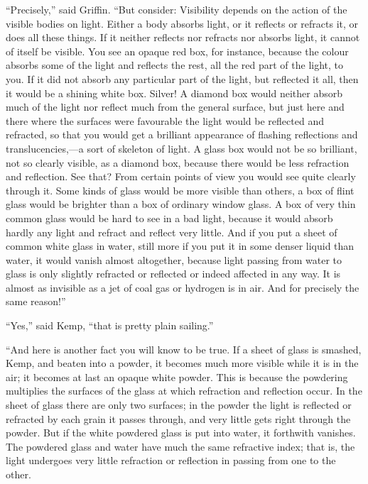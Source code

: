 “Precisely,” said Griffin. “But consider: Visibility depends on the action of the visible bodies on light. Either a body absorbs light, or it reflects or refracts it, or does all these things. If it neither reflects nor refracts nor absorbs light, it cannot of itself be visible. You see an opaque red box, for instance, because the colour absorbs some of the light and reflects the rest, all the red part of the light, to you. If it did not absorb any particular part of the light, but reflected it all, then it would be a shining white box. Silver! A diamond box would neither absorb much of the light nor reflect much from the general surface, but just here and there where the surfaces were favourable the light would be reflected and refracted, so that you would get a brilliant appearance of flashing reflections and translucencies,—a sort of skeleton of light. A glass box would not be so brilliant, not so clearly visible, as a diamond box, because there would be less refraction and reflection. See that? From certain points of view you would see quite clearly through it. Some kinds of glass would be more visible than others, a box of flint glass would be brighter than a box of ordinary window glass. A box of very thin common glass would be hard to see in a bad light, because it would absorb hardly any light and refract and reflect very little. And if you put a sheet of common white glass in water, still more if you put it in some denser liquid than water, it would vanish almost altogether, because light passing from water to glass is only slightly refracted or reflected or indeed affected in any way. It is almost as invisible as a jet of coal gas or hydrogen is in air. And for precisely the same reason!”

“Yes,” said Kemp, “that is pretty plain sailing.”

“And here is another fact you will know to be true. If a sheet of glass is smashed, Kemp, and beaten into a powder, it becomes much more visible while it is in the air; it becomes at last an opaque white powder. This is because the powdering multiplies the surfaces of the glass at which refraction and reflection occur. In the sheet of glass there are only two surfaces; in the powder the light is reflected or refracted by each grain it passes through, and very little gets right through the powder. But if the white powdered glass is put into water, it forthwith vanishes. The powdered glass and water have much the same refractive index; that is, the light undergoes very little refraction or reflection in passing from one to the other.


